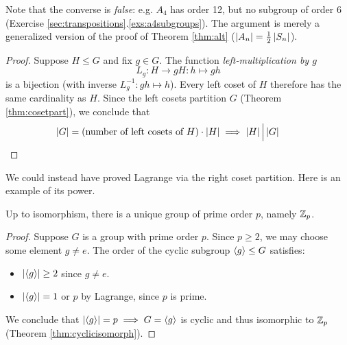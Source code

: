 Note that the converse is \emph{false}: e.g.{} $A_4$ has order 12, but no subgroup of order 6 (Exercise \ref*{sec:transpositions}.\ref{exs:a4subgroups}). The argument is merely a generalized version of the proof of Theorem \ref{thm:alt} ($\left| A_n\right|=\frac 12\left| S_n\right|$).



\begin{proof}
	Suppose $H\le G$ and fix $g\in G$. The function \emph{left-multiplication by $g$}
	\[
		L_g:H\to gH:h\mapsto gh
	\]
	is a bijection (with inverse $L_g^{-1}:gh\mapsto h$). Every left coset of $H$ therefore has the same cardinality as $H$. Since the left cosets partition $G$ (Theorem \ref{thm:cosetpart}), we conclude that
	\[
		\left| G\right|=\text{(number of left cosets of $H$)}\cdot \left| H\right|
		\implies \left| H\right|\Big\vert \left| G\right|
		\tag*{\qedhere}
	\]
\end{proof}


We could instead have proved Lagrange via the right coset partition. Here is an example of its power.

\begin{cor}{}{}
	Up to isomorphism, there is a unique group of prime order $p$, namely $\mathbb{Z}_p$.
\end{cor}

\begin{proof}
	Suppose $G$ is a group with prime order $p$. Since $p\ge 2$, we may choose some element $g\neq e$. The order of the cyclic subgroup $\left\langle g\right\rangle\le G$ satisfies:
	\begin{itemize}%
	  \item $\left| \left\langle g\right\rangle\right|\ge 2$ since $g\neq e$.
	  \item $\left| \left\langle g\right\rangle\right|=1$ or $p$ by Lagrange, since $p$ is prime.
	\end{itemize}
	We conclude that $\left| \left\langle g\right\rangle\right|=p\implies G=\left\langle g\right\rangle$ is cyclic and thus isomorphic to $\mathbb{Z}_p$ (Theorem \ref{thm:cyclicisomorph}).
\end{proof}

